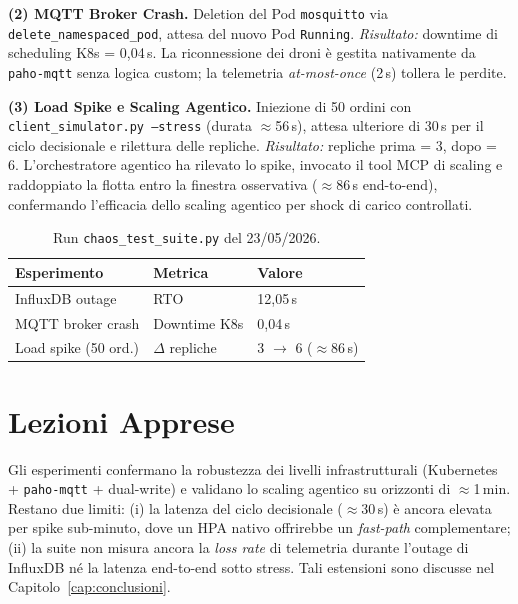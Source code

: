 \textbf{(2) MQTT Broker Crash.} Deletion del Pod \texttt{mosquitto} via \texttt{delete\_namespaced\_pod}, attesa del nuovo Pod \texttt{Running}. \textit{Risultato:} downtime di scheduling K8s = 0{,}04\,s. La riconnessione dei droni è gestita nativamente da \texttt{paho-mqtt} senza logica custom; la telemetria \textit{at-most-once} (2\,s) tollera le perdite.

\textbf{(3) Load Spike e Scaling Agentico.} Iniezione di 50 ordini con \texttt{client\_simulator.py --stress} (durata $\approx$56\,s), attesa ulteriore di 30\,s per il ciclo decisionale e rilettura delle repliche. \textit{Risultato:} repliche prima = 3, dopo = 6. L'orchestratore agentico ha rilevato lo spike, invocato il tool MCP di scaling e raddoppiato la flotta entro la finestra osservativa ($\approx$86\,s end-to-end), confermando l'efficacia dello scaling agentico per shock di carico controllati.

\begin{table}[ht]
\centering
\begin{tabular}{lll}
\toprule
\textbf{Esperimento} & \textbf{Metrica} & \textbf{Valore} \\
\midrule
InfluxDB outage      & RTO          & 12{,}05\,s \\
MQTT broker crash    & Downtime K8s & 0{,}04\,s \\
Load spike (50 ord.) & $\Delta$ repliche & 3 $\rightarrow$ 6 ($\approx$86\,s) \\
\bottomrule
\end{tabular}
\caption{Run \texttt{chaos\_test\_suite.py} del 23/05/2026.}
\label{tab:chaos_results}
\end{table}

\section{Lezioni Apprese}
\label{sec:lezioni_chaos}

Gli esperimenti confermano la robustezza dei livelli infrastrutturali (Kubernetes + \texttt{paho-mqtt} + dual-write) e validano lo scaling agentico su orizzonti di $\approx$1\,min. Restano due limiti: (i) la latenza del ciclo decisionale ($\approx$30\,s) è ancora elevata per spike sub-minuto, dove un HPA nativo offrirebbe un \emph{fast-path} complementare; (ii) la suite non misura ancora la \textit{loss rate} di telemetria durante l'outage di InfluxDB né la latenza end-to-end sotto stress. Tali estensioni sono discusse nel Capitolo~\ref{cap:conclusioni}.
